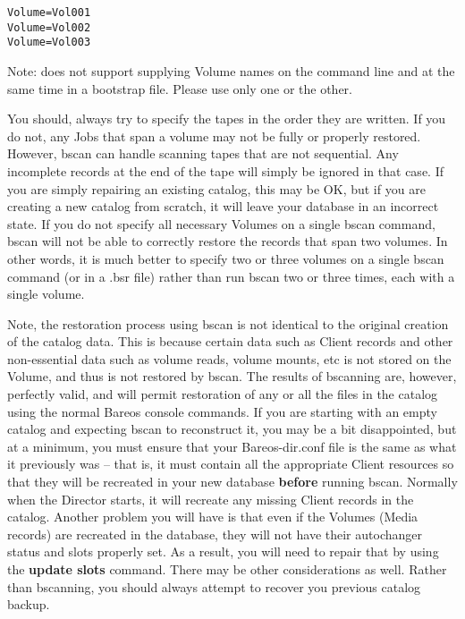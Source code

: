 \footnotesize
\begin{verbatim}
Volume=Vol001
Volume=Vol002
Volume=Vol003
\end{verbatim}
\normalsize

Note:  does not support supplying Volume names on the
command line and at the same time in a bootstrap file.  Please
use only one or the other.

You should, always try to specify the tapes in the order they are written.
If you do not, any Jobs that span a volume may not be fully or properly
restored. However, bscan can handle scanning tapes that are not sequential.  Any
incomplete records at the end of the tape will simply be ignored in that
case.  If you are simply repairing an existing catalog, this may be OK, but
if you are creating a new catalog from scratch, it will leave your database
in an incorrect state.  If you do not specify all necessary Volumes on a
single bscan command, bscan will not be able to correctly restore the
records that span two volumes.  In other words, it is much better to
specify two or three volumes on a single bscan command (or in a .bsr file)
rather than run bscan two or three times, each with a single volume.

Note, the restoration process using bscan is not identical to the original
creation of the catalog data. This is because certain data such as Client
records and other non-essential data such
as volume reads, volume mounts, etc is not stored on the Volume, and thus is
not restored by bscan. The results of bscanning are, however, perfectly valid,
and will permit restoration of any or all the files in the catalog using the
normal Bareos console commands.  If you are starting with an empty catalog
and expecting bscan to reconstruct it, you may be a bit disappointed, but
at a minimum, you must ensure that your Bareos-dir.conf file is the same
as what it previously was -- that is, it must contain all the appropriate
Client resources so that they will be recreated in your new database {\bf
before} running bscan. Normally when the Director starts, it will recreate
any missing Client records in the catalog.  Another problem you will have
is that even if the Volumes (Media records) are recreated in the database,
they will not have their autochanger status and slots properly set. As a
result, you will need to repair that by using the {\bf update slots}
command.  There may be other considerations as well.  Rather than
bscanning, you should always attempt to recover you previous catalog
backup.


